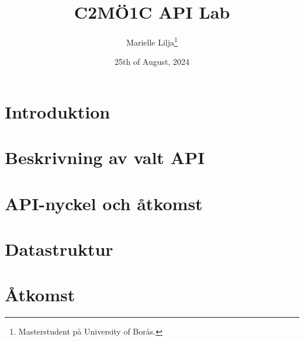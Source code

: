 \documentclass[12pt, letterpaper]{article}
\title{C2MÖ1C API Lab}
\author{Marielle Lilja\thanks{Masterstudent på University of Borås.}}
\date{25th of August, 2024}
\begin{document}
\maketitle

\tableofcontents

\section{Introduktion}

\section{Beskrivning av valt API}

\section{API-nyckel och åtkomst}

\section{Datastruktur}

\section{Åtkomst}
\end{document}
